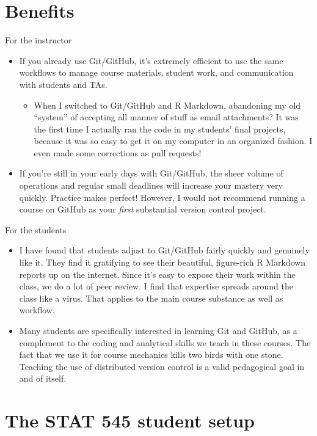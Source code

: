\documentclass[
]{book}
\providecommand{\tightlist}{%
  \setlength{\itemsep}{0pt}\setlength{\parskip}{0pt}}
\begin{document}
\section{Benefits}\label{benefits}

For the instructor

\begin{itemize}
\tightlist
\item
  If you already use Git/GitHub, it's extremely efficient to use the same workflows to manage course materials, student work, and communication with students and TAs.

  \begin{itemize}
  \tightlist
  \item
    When I switched to Git/GitHub and R Markdown, abandoning my old ``system'' of accepting all manner of stuff as email attachments? It was the first time I actually ran the code in my students' final projects, because it was so easy to get it on my computer in an organized fashion. I even made some corrections as pull requests!
  \end{itemize}
\item
  If you're still in your early days with Git/GitHub, the sheer volume of operations and regular small deadlines will increase your mastery very quickly. Practice makes perfect! However, I would not recommend running a course on GitHub as your \emph{first} substantial version control project.
\end{itemize}

For the students

\begin{itemize}
\tightlist
\item
  I have found that students adjust to Git/GitHub fairly quickly and genuinely like it. They find it gratifying to see their beautiful, figure-rich R Markdown reports up on the internet. Since it's easy to expose their work within the class, we do a lot of peer review. I find that expertise spreads around the class like a virus. That applies to the main course substance as well as workflow.
\item
  Many students are specifically interested in learning Git and GitHub, as a complement to the coding and analytical skills we teach in these courses. The fact that we use it for course mechanics kills two birds with one stone. Teaching the use of distributed version control is a valid pedagogical goal in and of itself.
\end{itemize}

\section{The STAT 545 student setup}\label{the-stat-545-student-setup}
\end{document}
